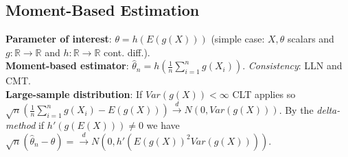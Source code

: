 \subsection{Moment-Based Estimation}
\textbf{Parameter of interest}: $\theta = h(E(g(X)))$ (simple case: $X, \theta$ scalars and $g:\mathbb{R}\to\mathbb{R}$ and $h:\mathbb{R}\to\mathbb{R}$ cont. diff.).\\
\textbf{Moment-based estimator}: $\hat{\theta}_n = h\left(\frac{1}{n}\sum_{i=1}^ng(X_i)\right)$. \emph{Consistency}: LLN and CMT. \\
\textbf{Large-sample distribution}: If $Var(g(X))<\infty$ CLT applies so $\sqrt{n}\left(\frac{1}{n}\sum_{i=1}^ng(X_i) - E(g(X))\right)\xrightarrow{d}N(0, Var(g(X)))$. By the \emph{delta-method} if $h'(g(E(X)))\neq0$ we have 
$		\sqrt{n}(\hat{\theta}_n - \theta) = 
		\xrightarrow{d} N(0, h'(E(g(X))^2Var(g(X)))).$
